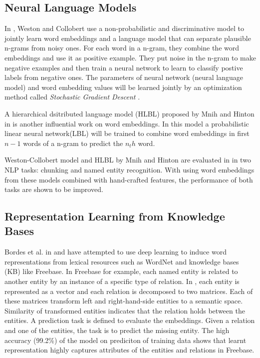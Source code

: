 \documentclass[preprint,12pt]{elsarticle}
\begin{document}
\subsection{Neural Language Models}
\label{rel-work:lang-model}

In \cite{Collobert2008a}, Weston and Collobert use a non-probabilistic and
discriminative model to jointly learn word embeddings and a language model that
can separate plausible n-grams from noisy ones. For each word in a n-gram, they
combine the word embeddings and use it as positive example. They put noise in
the n-gram to make negative examples and then train a neural network to learn to
classify postive labels from negative ones. The parameters of neural network
(neural language model) and word embedding values will be learned jointly by an
optimization method called \emph{Stochastic Gradient Descent} \cite{Bottou2010}.

A hierarchical dsitributed language model (HLBL) proposed by Mnih and
Hinton in \cite{Mnih2009} is another influential work on word embeddings. In
this model a probabilistic linear neural network(LBL) will be trained to 
combine word embeddings in first $n-1$ words of a n-gram to predict the $n_th$ word.

Weston-Collobert model and HLBL by Mnih and Hinton are evaluated in
\cite{Turian2010b} in two NLP tasks: chunking and named entity recognition. With
using word embeddings from these models combined with hand-crafted features, the
performance of both tasks are shown to be improved.

\subsection{Representation Learning from Knowledge Bases}
\label{rel-work:structured-embedding}

Bordes et al. in \cite{Bordes2011} and \cite{Bordes2012} have attempted to use
deep learning to induce word representations from lexical resources such as
WordNet and knowledge bases (KB) like Freebase. In Freebase for example, each named entity is related
to another entity by an instance of a specific type of relation. In
\cite{Bordes2011}, each entity is represented as a vector and each relation is decomposed to two
matrices. Each of these matrices transform left and right-hand-side entities
to a semantic space. Similarity of transformed entities indicates that the
relation holds between the entities.  A prediction task is defined to evaluate
the embeddings. Given a relation and one of the entities, the task is to predict
the missing entity. The high accuracy (99.2\%) of the model on prediciton
of training data shows that learnt representation highly captures attributes of
the entities and relations in Freebase.
\end{document}
